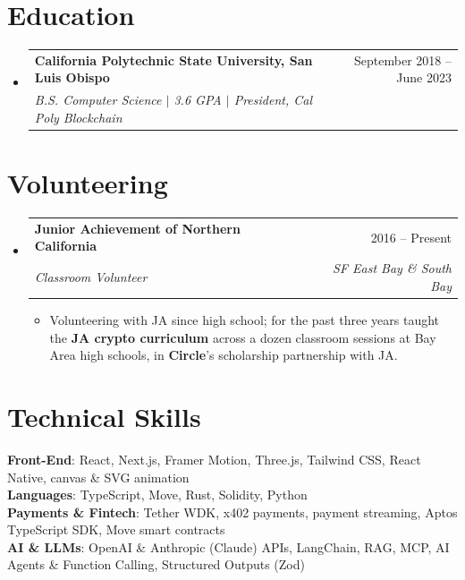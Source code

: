 \documentclass[letterpaper,9pt]{extarticle}
\makeatletter
\newcommand{\resumeItem}[1]{
  \item\small{
    {#1\vspace{-2pt}}
  }
}
\newcommand{\resumeSubheading}[4]{
  \vspace{-2pt}\item
    \begin{tabular*}{0.97\textwidth}[t]{l@{\extracolsep{\fill}}r}
      \textbf{#1} & #2 \\
      \textit{\small#3} & \textit{\small #4} \\
    \end{tabular*}\vspace{-7pt}
}
\newcommand{\resumeSubHeadingListStart}{\begin{itemize}[leftmargin=0.15in, label={}]}
\newcommand{\resumeSubHeadingListEnd}{\end{itemize}}
\newcommand{\resumeItemListStart}{\begin{itemize}}
\newcommand{\resumeItemListEnd}{\end{itemize}\vspace{-5pt}}
\makeatother
\begin{document}
\section{Education}
  \resumeSubHeadingListStart
    \resumeSubheading
      {California Polytechnic State University, San Luis Obispo}{September 2018 -- June 2023}
      {B.S. Computer Science $|$ 3.6 GPA $|$ President, Cal Poly Blockchain}{}
  \resumeSubHeadingListEnd

\section{Volunteering}
  \resumeSubHeadingListStart
    \resumeSubheading
      {Junior Achievement of Northern California}{2016 -- Present}
      {Classroom Volunteer}{SF East Bay \& South Bay}
      \resumeItemListStart
        \resumeItem{Volunteering with JA since high school; for the past three years taught the \textbf{JA crypto curriculum} across a dozen classroom sessions at Bay Area high schools, in \textbf{Circle}'s scholarship partnership with JA.}
      \resumeItemListEnd
  \resumeSubHeadingListEnd

\section{Technical Skills}
 \begin{itemize}[leftmargin=0.15in, label={}]
    \small{\item{
     \textbf{Front-End}{: React, Next.js, Framer Motion, Three.js, Tailwind CSS, React Native, canvas \& SVG animation} \\
     \textbf{Languages}{: TypeScript, Move, Rust, Solidity, Python} \\
     \textbf{Payments \& Fintech}{: Tether WDK, x402 payments, payment streaming, Aptos TypeScript SDK, Move smart contracts} \\
     \textbf{AI \& LLMs}{: OpenAI \& Anthropic (Claude) APIs, LangChain, RAG, MCP, AI Agents \& Function Calling, Structured Outputs (Zod)}
    }}
 \end{itemize}
\end{document}
